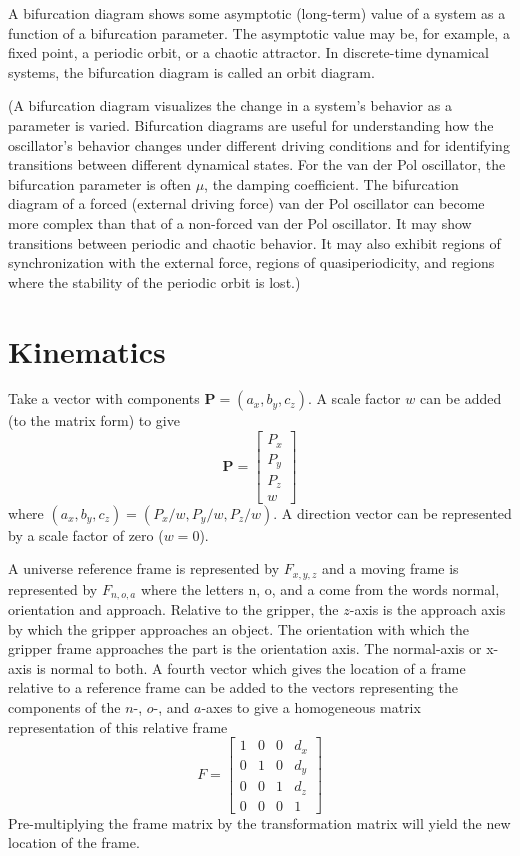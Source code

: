 \documentclass[11pt]{book}
\theoremstyle{example}
\begin{document}
A bifurcation diagram shows some asymptotic (long-term) value of a system as a function of a bifurcation parameter. The asymptotic value may be, for example, a fixed point, a periodic orbit, or a chaotic attractor. In discrete-time dynamical systems, the bifurcation diagram is called an orbit diagram.

(A bifurcation diagram visualizes the change in a system's behavior as a parameter is varied. Bifurcation diagrams are useful for understanding how the oscillator's behavior changes under different driving conditions and for identifying transitions between different dynamical states. For the van der Pol oscillator, the bifurcation parameter is often $\mu$, the damping coefficient. The bifurcation diagram of a forced (external driving force) van der Pol oscillator can become more complex than that of a non-forced van der Pol oscillator. It may show transitions between periodic and chaotic behavior. It may also exhibit regions of synchronization with the external force, regions of quasiperiodicity, and regions where the stability of the periodic orbit is lost.)

\section{Kinematics}

Take a vector with components $\mathbf{P}=(a_x,b_y,c_z)$. A scale factor $w$ can be added (to the matrix form) to give
\begin{equation}
	\mathbf{P}=
	\begin{bmatrix}
		P_x\\
		P_y\\
		P_z\\
		w
	\end{bmatrix}
\end{equation}
where $(a_x,b_y,c_z)=(P_x/w,P_y/w,P_z/w)$. A direction vector can be represented by a scale factor of zero ($w=0$).

A universe reference frame is represented by $F_{x,y,z}$ and a moving frame is represented by $F_{n,o,a}$ where the letters n, o, and a come from the words normal, orientation and approach. Relative to the gripper, the $z$-axis is the approach axis by which the gripper approaches an object. The orientation with which the gripper frame approaches the part is the orientation axis. The normal-axis or x-axis is normal to both. A fourth vector which gives the location of a frame relative to a reference frame can be added to the vectors representing the components of the $n$-, $o$-, and $a$-axes to give a homogeneous matrix representation of this relative frame
\begin{equation}
	F=
	\begin{bmatrix}
		1&0&0&d_x\\
		0&1&0&d_y\\
		0&0&1&d_z\\
		0&0&0&1
	\end{bmatrix}
\end{equation}
Pre-multiplying the frame matrix by the transformation matrix will yield the new location of the frame.
\end{document}
